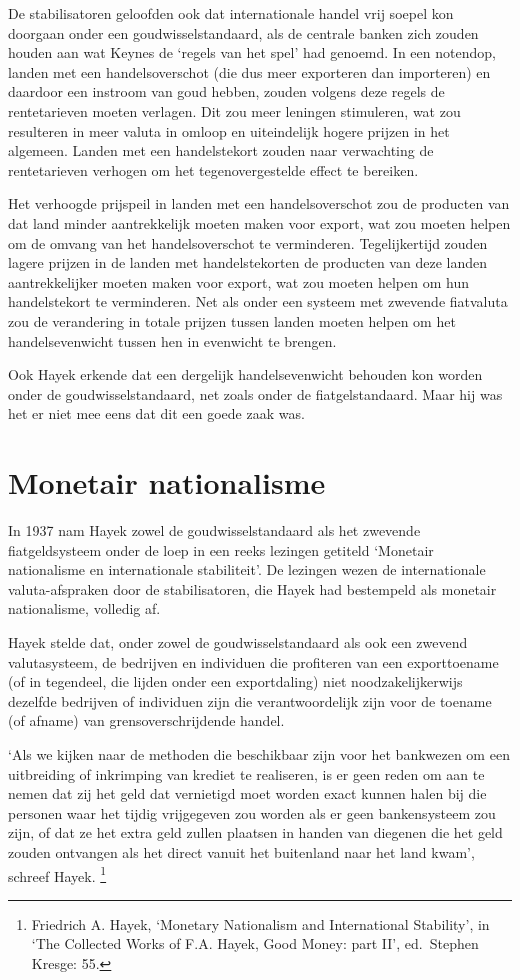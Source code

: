 \documentclass[smalldemyvopaper,11pt,twoside,onecolumn,openright,extrafontsizes,hidelinks]{memoir}
\begin{document}
De stabilisatoren geloofden ook dat internationale handel vrij soepel
kon doorgaan onder een goudwisselstandaard, als de centrale banken zich
zouden houden aan wat Keynes de `regels van het spel' had genoemd. In
een notendop, landen met een handelsoverschot (die dus meer exporteren
dan importeren) en daardoor een instroom van goud hebben, zouden volgens
deze regels de rentetarieven moeten verlagen. Dit zou meer leningen
stimuleren, wat zou resulteren in meer valuta in omloop en uiteindelijk
hogere prijzen in het algemeen. Landen met een handelstekort zouden naar
verwachting de rentetarieven verhogen om het tegenovergestelde effect te
bereiken.

Het verhoogde prijspeil in landen met een handelsoverschot zou de
producten van dat land minder aantrekkelijk moeten maken voor export,
wat zou moeten helpen om de omvang van het handelsoverschot te
verminderen. Tegelijkertijd zouden lagere prijzen in de landen met
handelstekorten de producten van deze landen aantrekkelijker moeten
maken voor export, wat zou moeten helpen om hun handelstekort te
verminderen. Net als onder een systeem met zwevende fiatvaluta zou de
verandering in totale prijzen tussen landen moeten helpen om het
handelsevenwicht tussen hen in evenwicht te brengen.

Ook Hayek erkende dat een dergelijk handelsevenwicht behouden kon worden
onder de goudwisselstandaard, net zoals onder de fiatgelstandaard. Maar
hij was het er niet mee eens dat dit een goede zaak was.

\section{Monetair nationalisme}\label{monetair-nationalisme}

In 1937 nam Hayek zowel de goudwisselstandaard als het zwevende
fiatgeldsysteem onder de loep in een reeks lezingen getiteld `Monetair
nationalisme en internationale stabiliteit'. De lezingen wezen de
internationale valuta-afspraken door de stabilisatoren, die Hayek had
bestempeld als monetair nationalisme, volledig af.

Hayek stelde dat, onder zowel de goudwisselstandaard als ook een zwevend
valutasysteem, de bedrijven en individuen die profiteren van een
exporttoename (of in tegendeel, die lijden onder een exportdaling) niet
noodzakelijkerwijs dezelfde bedrijven of individuen zijn die
verantwoordelijk zijn voor de toename (of afname) van
grensoverschrijdende handel.

`Als we kijken naar de methoden die beschikbaar zijn voor het bankwezen
om een uitbreiding of inkrimping van krediet te realiseren, is er geen
reden om aan te nemen dat zij het geld dat vernietigd moet worden exact
kunnen halen bij die personen waar het tijdig vrijgegeven zou worden als
er geen bankensysteem zou zijn, of dat ze het extra geld zullen plaatsen
in handen van diegenen die het geld zouden ontvangen als het direct
vanuit het buitenland naar het land kwam', schreef Hayek. \footnote{\hspace{0pt}Friedrich
  A. Hayek, `Monetary Nationalism and International Stability', in `The
  Collected Works of F.A. Hayek, Good Money: part II', ed.~Stephen
  Kresge: 55.}
\end{document}
